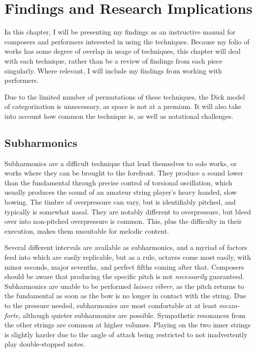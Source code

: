 
\chapter{Findings and Research Implications} \label{ch:chapter4}
In this chapter, I will be presenting my findings as an instructive manual for composers and performers interested in using the techniques.
Because my folio of works has some degree of overlap in usage of techniques, this chapter will deal with each technique, rather than be a review of findings from each piece singularly.
Where relevant, I will include my findings from working with performers.

Due to the limited number of permutations of these techniques, the Dick model of categorization is unnecessary, as space is not at a premium.\autocite{dickOtherFlute1989} 
It will also take into account how common the technique is, as well as notational challenges.

\section{Subharmonics} \label{sec:subharmonics}
Subharmonics are a difficult technique that lend themselves to solo works, or works where they can be brought to the forefront.
They produce a sound lower than the fundamental through precise control of torsional oscillation, which usually produces the sound of an amateur string player's heavy handed, slow bowing. 
The timbre of overpressure can vary, but is identifiably pitched, and typically is somewhat nasal.
They are notably different to overpressure, but bleed over into non-pitched overpressure is common.
This, plus the difficulty in their execution, makes them unsuitable for melodic content.

Several different intervals are available as subharmonics, and a myriad of factors feed into which are easily replicable, but as a rule, octaves come most easily, with minor seconds, major sevenths, and perfect fifths coming after that.
Composers should be aware that producing the specific pitch is not \emph{necessarily} guaranteed.
Subharmonics are unable to be performed \emph{laissez vibrer}, as the pitch returns to the fundamental as soon as the bow is no longer in contact with the string.\autocite[]{appleseedFeedbackExploratorySession2019}
Due to the pressure needed, subharmonics are most comfortable at at least \emph{mezzo-forte}, although quieter subharmonics are possible. 
Sympathetic resonances from the other strings are common at higher volumes.
Playing on the two inner strings is slightly harder due to the angle of attack being restricted to not inadvertently play double-stopped notes.\autocite[99]{welbanksFoundationsModernCello}



